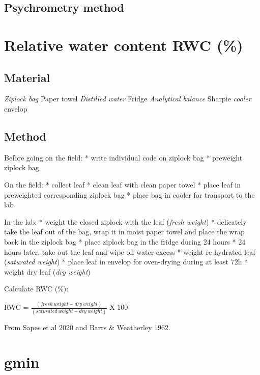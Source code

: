 \documentclass[
  12pt,
  american,
  a4paper,
  extrafontsizes,onecolumn,openright
  ]{memoir}
\begin{document}
\hypertarget{psychrometry-method}{%
\subsection{Psychrometry method}\label{psychrometry-method}}

\hypertarget{relative-water-content-rwc}{%
\section{Relative water content RWC (\%)}\label{relative-water-content-rwc}}

\hypertarget{material}{%
\subsection{Material}\label{material}}

\emph{Ziplock bag
}Paper towel
\emph{Distilled water
}Fridge
\emph{Analytical balance
}Sharpie
\emph{cooler
}envelop

\hypertarget{method}{%
\subsection{Method}\label{method}}

Before going on the field:
* write individual code on ziplock bag
* preweight ziplock bag

On the field:
* collect leaf
* clean leaf with clean paper towel
* place leaf in preweighted corresponding ziplock bag
* place bag in cooler for transport to the lab

In the lab:
* weight the closed ziplock with the leaf (\emph{fresh weight})
* delicately take the leaf out of the bag, wrap it in moist paper towel and place the wrap back in the ziplock bag
* place ziplock bag in the fridge during 24 hours
* 24 hours later, take out the leaf and wipe off water excess
* weight re-hydrated leaf (\emph{saturated weight})
* place leaf in envelop for oven-drying during at least 72h
* weight dry leaf (\emph{dry weight})

Calculate RWC (\%):

RWC = \(\frac{(fresh\ weight-dry\ weight)}{(saturated\ weight-dry\ weight)}\) X 100

From Sapes et al 2020 and Barrs \& Weatherley 1962.

\hypertarget{gmin}{%
\section{gmin}\label{gmin}}
\end{document}
